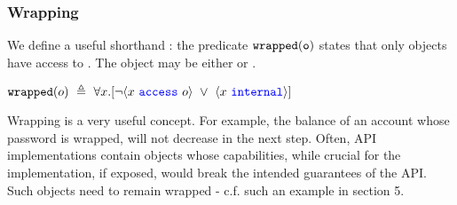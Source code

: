  

\subsubsection{Wrapping}

We define a useful shorthand : the predicate $\texttt{wrapped}( {\texttt{o}} )$  states 
that only \internalO objects have access to .
The object  may be either \internalO or \externalO.
\begin{definition}[Wrapped]
$\texttt{wrapped}( o )\ \triangleq\ \forall x.[\neg \langle x\ {\color{blue}\texttt{access}}\ o \rangle\ \vee\ \langle x\ {\color{blue}\texttt{internal}}\rangle]$
\end{definition}

Wrapping is a very useful concept. For example, the balance of an account whose
  password is wrapped,  will not decrease in the next step.
  Often, API implementations contain objects whose capabilities, while  crucial for the implementation, if exposed,
would break the intended guarantees of the API. Such objects need to remain wrapped - c.f.
such an example in section 5. 
 
